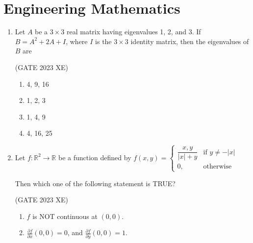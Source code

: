 \documentclass[journal,12pt,onecolumn]{IEEEtran}
\begin{document}
\newpage
\section*{Engineering Mathematics}

\noindent

\bigskip

\begin{enumerate}

\item Let $A$ be a $3 \times 3$ real matrix having eigenvalues 1, 2, and 3. If $B= A^2 + 2A + I$,
where $I$ is the $3 \times 3$ identity matrix, then the eigenvalues of $B$ are

\hfill{(GATE 2023 XE)}

\begin{multicols}{2}

\begin{enumerate}

\item 4, 9, 16

\item 1, 2, 3

\item 1, 4, 9

\item 4, 16, 25

\end{enumerate}

\end{multicols}

\item Let $f: \mathbb{R}^2 \to \mathbb{R}$ be a function defined by
$f(x,y)=
\begin{cases}
\dfrac{x,y}{|x|+y} & \text{if } y\neq -|x| \\
0 , & \text{otherwise}
\end{cases}$

Then which one of the following statement is TRUE?

\hfill{(GATE 2023 XE)}

\begin{multicols}{2}

\begin{enumerate}

\item $f$ is NOT continuous at $(0,0)$.

\item $\frac{\partial f}{\partial x}(0,0) = 0$, and $\frac{\partial f}{\partial y}(0,0) = 1$.


\end{enumerate}
\end{multicols}
\end{enumerate}
\end{document}
